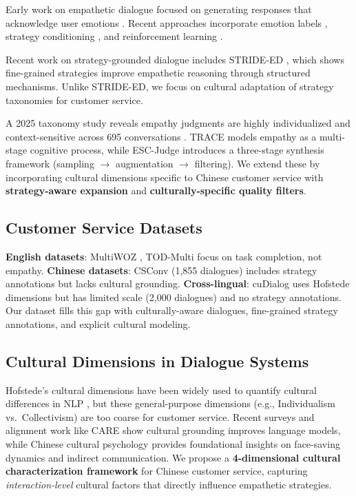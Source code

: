 \documentclass[11pt]{article}
\begin{document}
Early work on empathetic dialogue focused on generating responses that acknowledge user emotions \cite{empathetic_dialogues_2019}. Recent approaches incorporate emotion labels \cite{EmoConv_2021}, strategy conditioning \cite{ESConv_2022}, and reinforcement learning \cite{MISC_2022}.

Recent work on strategy-grounded dialogue includes STRIDE-ED \cite{STRIDE_ED_2024}, which shows fine-grained strategies improve empathetic reasoning through structured mechanisms. Unlike STRIDE-ED, we focus on cultural adaptation of strategy taxonomies for customer service.

A 2025 taxonomy study reveals empathy judgments are highly individualized and context-sensitive across 695 conversations \cite{empathy_taxonomy_2025}. TRACE \cite{TRACE_2025} models empathy as a multi-stage cognitive process, while ESC-Judge \cite{ESC_Judge_2025} introduces a three-stage synthesis framework (sampling $\to$ augmentation $\to$ filtering). We extend these by incorporating cultural dimensions specific to Chinese customer service with \textbf{strategy-aware expansion} and \textbf{culturally-specific quality filters}.

\subsection{Customer Service Datasets}

\textbf{English datasets}: MultiWOZ \cite{MultiWOZ_2020}, TOD-Multi \cite{TOD_Multi_2023} focus on task completion, not empathy. \textbf{Chinese datasets}: CSConv \cite{CSC_2024} (1,855 dialogues) includes strategy annotations but lacks cultural grounding. \textbf{Cross-lingual}: cuDialog \cite{cuDialog_2024} uses Hofstede dimensions but has limited scale (2,000 dialogues) and no strategy annotations. Our dataset fills this gap with culturally-aware dialogues, fine-grained strategy annotations, and explicit cultural modeling.

\subsection{Cultural Dimensions in Dialogue Systems}

Hofstede's cultural dimensions \cite{hofstede_1984} have been widely used to quantify cultural differences in NLP \cite{cuDialog_2024, LLM_cultural_values_2024}, but these general-purpose dimensions (e.g., Individualism vs.\ Collectivism) are too coarse for customer service. Recent surveys \cite{culturally_aware_nlp_2024} and alignment work like CARE \cite{CARE_2024} show cultural grounding improves language models, while Chinese cultural psychology \cite{chinese_cultural_psychology_2023} provides foundational insights on face-saving dynamics and indirect communication. We propose a \textbf{4-dimensional cultural characterization framework} for Chinese customer service, capturing \textit{interaction-level} cultural factors that directly influence empathetic strategies.
\end{document}
